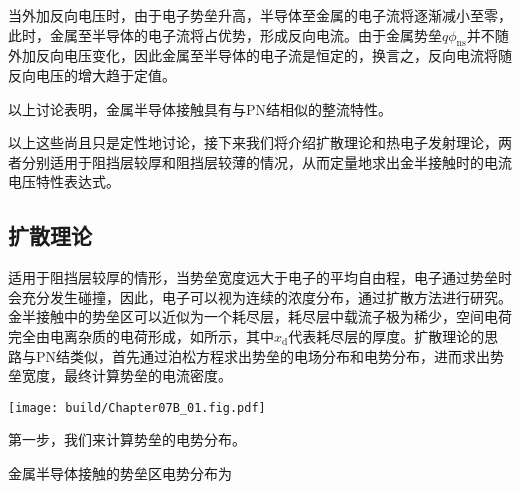 当外加反向电压时，由于电子势垒升高，半导体至金属的电子流将逐渐减小至零，此时，金属至半导体的电子流将占优势，形成反向电流。由于金属势垒$q\phi_\text{ns}$并不随外加反向电压变化，因此金属至半导体的电子流是恒定的，换言之，反向电流将随反向电压的增大趋于定值。

以上讨论表明，金属半导体接触具有与PN结相似的整流特性。

以上这些尚且只是定性地讨论，接下来我们将介绍扩散理论和热电子发射理论，两者分别适用于阻挡层较厚和阻挡层较薄的情况，从而定量地求出金半接触时的电流电压特性表达式。

\subsection{扩散理论}
适用于阻挡层较厚的情形，当势垒宽度远大于电子的平均自由程，电子通过势垒时会充分发生碰撞，因此，电子可以视为连续的浓度分布，通过扩散方法进行研究。金半接触中的势垒区可以近似为一个耗尽层，耗尽层中载流子极为稀少，空间电荷完全由电离杂质的电荷形成，如所示，其中$x_\text{d}$代表耗尽层的厚度。扩散理论的思路与PN结类似，首先通过泊松方程求出势垒的电场分布和电势分布，进而求出势垒宽度，最终计算势垒的电流密度。

\begin{Figure}[金半接触的耗尽层]
    \texttt{[image: build/Chapter07B\_01.fig.pdf]}
\end{Figure}

第一步，我们来计算势垒的电势分布。
\begin{BoxFormula}[金半接触的势垒电势]
    金属半导体接触的势垒区电势分布为
\end{BoxFormula}

